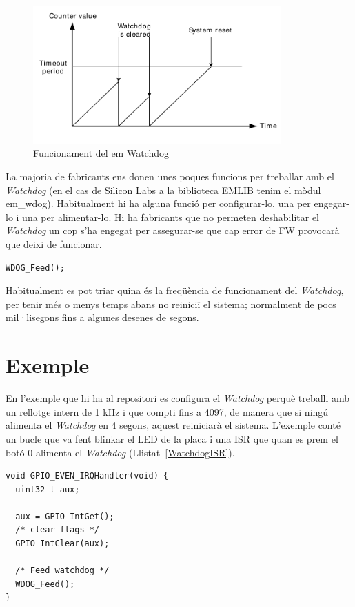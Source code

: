 \begin{figure}
 \centering
 \includegraphics[width=0.85\textwidth, keepaspectratio]{imatges/Watchdog.png}
 \caption{Funcionament del {em Watchdog} \cite{EFM_AN0015}}
 \label{fig:Watchdog}
\end{figure}

La majoria de fabricants ens donen unes poques funcions per treballar amb el {\em Watchdog} (en el cas de Silicon Labs a la biblioteca EMLIB tenim el mòdul em\_wdog). Habitualment hi ha alguna funció per configurar-lo, una per engegar-lo i una per alimentar-lo. Hi ha fabricants que no permeten deshabilitar el {\em Watchdog} un cop s'ha engegat per assegurar-se que cap error de \gls{FW} provocarà que deixi de funcionar.
\begin{lstlisting}[style=customc]
WDOG_Feed();
\end{lstlisting}

Habitualment es pot triar quina és la freqüència de funcionament del {\em Watchdog}, per tenir més o menys temps abans no reiniciï el sistema; normalment de pocs mil·lisegons fins a algunes desenes de segons.

\section{Exemple}
\label{sub:Watchdog_example}
En l'\href{https://github.com/mariusmm/cursembedded/tree/master/Simplicity/Watchdog}{exemple que hi ha al repositori}
es configura el {\em Watchdog} perquè treballi amb un rellotge intern de 1 kHz i que compti fins a 4097, de manera que si ningú alimenta el {\em Watchdog} en 4 segons, aquest reiniciarà el sistema. L'exemple conté un bucle que va fent blinkar el LED de la placa i una \gls{ISR} que quan es prem el botó 0 alimenta el {\em Watchdog} (Llistat~\ref{WatchdogISR}).

\begin{lstlisting}[style=customc,caption={ISR del botó que alimenta el {\em Watchdog}},label=WatchdogISR]
void GPIO_EVEN_IRQHandler(void) {
  uint32_t aux;

  aux = GPIO_IntGet();
  /* clear flags */
  GPIO_IntClear(aux);

  /* Feed watchdog */
  WDOG_Feed();
}
\end{lstlisting}

